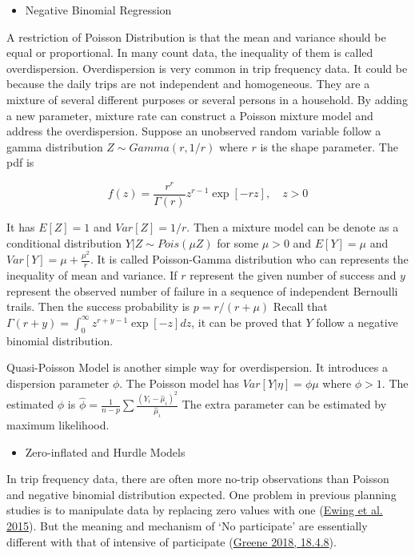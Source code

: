 \documentclass[
  11pt,
  openany]{memoir}
\providecommand{\tightlist}{%
  \setlength{\itemsep}{0pt}\setlength{\parskip}{0pt}}
\begin{document}
\begin{itemize}
\tightlist
\item
  Negative Binomial Regression
\end{itemize}

A restriction of Poisson Distribution is that the mean and variance should be equal or proportional.
In many count data, the inequality of them is called overdispersion.
Overdispersion is very common in trip frequency data. It could be because the daily trips are not independent and homogeneous. They are a mixture of several different purposes or several persons in a household.
By adding a new parameter, mixture rate can construct a Poisson mixture model and address the overdispersion.
Suppose an unobserved random variable follow a gamma distribution \(Z\sim Gamma(r,1/r)\) where \(r\) is the shape parameter. The pdf is

\begin{equation}
f(z)=\frac{r^r}{\Gamma(r)}z^{r-1}\exp[-rz],\quad z>0
\end{equation}

It has \(E[Z]=1\) and \(Var[Z]=1/r\).
Then a mixture model can be denote as a conditional distribution \(Y|Z\sim Pois(\mu Z)\) for some \(\mu>0\) and
\(E[Y]=\mu\) and \(Var[Y]=\mu+\frac{\mu^2}{r}\).
It is called Poisson-Gamma distribution who can represents the inequality of mean and variance.
If \(r\) represent the given number of success and \(y\) represent the observed number of failure in a sequence of independent Bernoulli trails. Then the success probability is \(p=r/(r+\mu)\)
Recall that \(\Gamma(r+y)=\int_0^\infty z^{r+y-1}\exp[-z]dz\), it can be proved that \(Y\) follow a negative binomial distribution.

Quasi-Poisson Model is another simple way for overdispersion. It introduces a dispersion parameter \(\phi\). The Poisson model has \(Var[Y|\eta]=\phi\mu\) where \(\phi>1\). The estimated \(\phi\) is
\(\hat\phi=\frac{1}{n-p}\sum\frac{(Y_i-\hat\mu_i)^2}{\hat\mu_i}\)
The extra parameter can be estimated by maximum likelihood.

\begin{itemize}
\tightlist
\item
  Zero-inflated and Hurdle Models
\end{itemize}

In trip frequency data, there are often more no-trip observations than Poisson and negative binomial distribution expected. One problem in previous planning studies is to manipulate data by replacing zero values with one (\protect\hyperlink{ref-ewingVaryingInfluencesBuilt2015}{Ewing et al. 2015}). But the meaning and mechanism of `No participate' are essentially different with that of intensive of participate (\protect\hyperlink{ref-greeneEconometricAnalysis2018}{Greene 2018, 18.4.8}).
\end{document}

